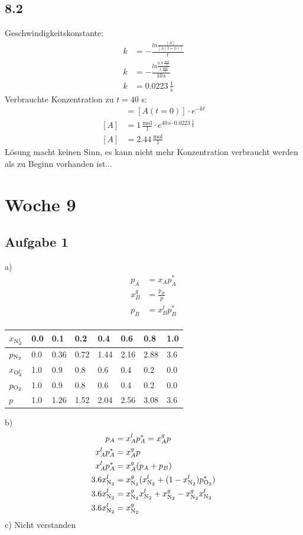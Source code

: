 \documentclass{article}
\begin{document}
\subsection*{8.2}
Geschwindigkeitskonstante:
\begin{align*}
    k &= - \frac{ln \frac{[A]}{[A(t=0)]}}{t}\\
    k &= - \frac{ln \frac{0.8\,\mathrm{\frac{mol}{l}}}{1\,\mathrm{\frac{mol}{l}}}}{10\,\mathrm{s}}\\
    k &= 0.0223\,\mathrm{\frac{1}{s}}
\end{align*}
Verbrauchte Konzentration zu $t= 40$ s:
\begin{align*}
    [A] &= [A(t=0)]\cdot e^{-kt}\\
    [A] &= 1\,\mathrm{\frac{mol}{l}} \cdot e^{40\,\mathrm{s} \cdot 0.0223\,\mathrm{\frac{1}{s}}}\\
    [A] &= 2.44\,\mathrm{\frac{mol}{l}}
\end{align*}
Lösung macht keinen Sinn, es kann nicht mehr Konzentration verbraucht werden als zu Beginn vorhanden ist...\\

\section*{Woche 9}
\subsection*{Aufgabe 1}
a)
\begin{align*}
    p_A &= x_Ap^*_A\\
    x_B^g &= \frac{p_B}{p}\\
    p_B &= x_B^lp^*_B\\
\end{align*}
\begin{center}
    \begin{tabular}{l l l l l l l l}
        \hline
        $x_{\ce{N2}^l}$ & 0.0 & 0.1 & 0.2 & 0.4 & 0.6 & 0.8 & 1.0 \\
        \hline
        $p_{\ce{N2}}$ & 0.0 & 0.36 & 0.72 & 1.44 & 2.16 & 2.88 & 3.6 \\
        $x_{\ce{O2}^l}$ & 1.0 & 0.9 & 0.8 & 0.6 & 0.4 & 0.2 & 0.0 \\
        $p_{\ce{O2}}$ & 1.0 & 0.9 & 0.8 & 0.6 & 0.4 & 0.2 & 0.0 \\
        $p$ & 1.0 & 1.26 & 1.52 & 2.04 & 2.56 & 3.08 & 3.6 \\ 
    \end{tabular}
\end{center}
b)
\begin{align*}
    p_A &= x^l_Ap^*_A = x^g_Ap\\
    x^l_Ap^*_A &= x^g_Ap\\
    x^l_Ap^*_A &= x^g_A(p_A+p_B)\\
    3.6x^l_{\ce{N2}} &= x^g_{\ce{N2}}(x^l_{\ce{N2}}+(1-x^l_{\ce{N2}})p^*_{\ce{O2}})\\
    3.6x^l_{\ce{N2}} &= x^g_{\ce{N2}}x^l_{\ce{N2}}+x^g_{\ce{N2}}-x^g_{\ce{N2}}x^l_{\ce{N2}}\\
    3.6x^l_{\ce{N2}} &= x^g_{\ce{N2}}
\end{align*}
c) Nicht verstanden
\end{document}
